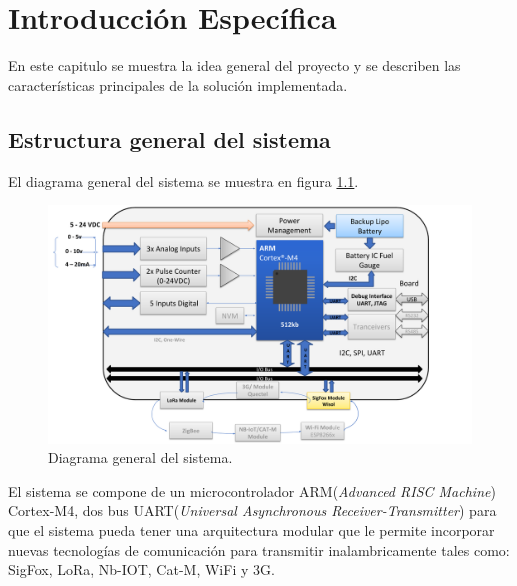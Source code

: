 \chapter{Introducción Específica} %

\label{Chapter2}

En este capitulo se muestra la idea general del proyecto y se describen las características principales de la solución implementada.
\section{Estructura general del sistema}


El diagrama general del sistema se muestra en figura \ref{fig:esquemaGeneral}.



\begin{figure}[h]

	\centering

	\includegraphics[scale=.35]{./Figures/esquemaGeneral.png}

	\caption{Diagrama general del sistema.}

	\label{fig:esquemaGeneral}

\end{figure}



El sistema se compone de un microcontrolador ARM(\textit{Advanced RISC Machine}) Cortex\textregistered -M4, dos bus UART(\textit{Universal Asynchronous Receiver-Transmitter}) para que el sistema pueda tener una arquitectura modular que le permite incorporar nuevas tecnologías de comunicación para transmitir inalambricamente tales como: SigFox, LoRa, Nb-IOT, Cat-M, WiFi y 3G.

